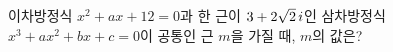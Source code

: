 이차방정식 $x^2+ax+12=0$과 한 근이 $3+2\sqrt{2}\mkern3mu i$인 삼차방정식 $x^3+ax^2+bx+c=0$이 공통인 근 $m$을 가질 때, $m$의 값은? 
